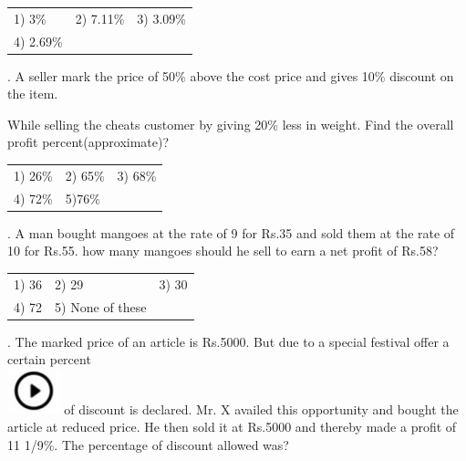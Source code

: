 \documentclass{article} %
\begin{document}
\noindent 
\begin{tabular}{p{1.7in} p{1.6in} p{1.6in}} \\ 
	1) 3\%                      &  2) 7.11\%           &  3) 3.09\%           \\
4) 2.69\% \\
\end{tabular}

\noindent 

. A seller mark the price of 50\% above the cost price and gives 10\% discount on the item.

\noindent 

\noindent While selling the cheats customer by giving 20\% less in weight. Find the overall profit percent(approximate)?

\noindent 
\begin{tabular}{p{1.7in} p{1.6in} p{1.6in}} \\ 
	1) 26\%                    &  2) 65\%              &  3) 68\%              \\
4) 72\%              & 5)76\%  \\
\end{tabular}

\noindent 

\noindent 

. A man bought mangoes at the rate of 9 for Rs.35 and sold them at the rate of 10 for Rs.55. how many mangoes should he sell to earn a net profit of Rs.58?

\noindent 
\begin{tabular}{p{1.7in} p{1.6in} p{1.6in}} \\ 
	1) 36                        &  2) 29                 &  3) 30                 \\
4) 72                 & 5) None of these  \\
\end{tabular}

\noindent 

. The marked price of an article is Rs.5000. But due to a special festival offer a certain percent  
\noindent \\ \includegraphics*[width=0.60in, height=0.52in]{images/image1} of discount is declared. Mr. X availed this opportunity and bought the article at reduced price. He  then sold it at Rs.5000 and thereby made a profit of 11 1/9\%. The percentage of discount allowed was?
\end{document}
